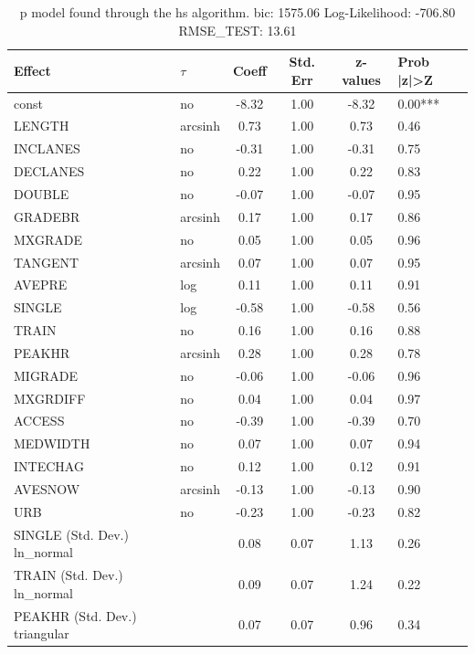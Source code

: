 \begin{table}
	\caption{p model found through the hs algorithm. bic: 1575.06 Log-Likelihood: -706.80 RMSE_TEST: 13.61}
	\begin{center}
		\begin{tabular}{|l|l|c|c|c|l|}
			\hline
			Effect & $\tau$ & Coeff & Std. Err & z-values & Prob |z|>Z \\
			\hline
			const & no & -8.32 & 1.00 & -8.32 & 0.00*** \\
			\hline
			LENGTH & arcsinh & 0.73 & 1.00 & 0.73 & 0.46 \\
			\hline
			INCLANES & no & -0.31 & 1.00 & -0.31 & 0.75 \\
			\hline
			DECLANES & no & 0.22 & 1.00 & 0.22 & 0.83 \\
			\hline
			DOUBLE & no & -0.07 & 1.00 & -0.07 & 0.95 \\
			\hline
			GRADEBR & arcsinh & 0.17 & 1.00 & 0.17 & 0.86 \\
			\hline
			MXGRADE & no & 0.05 & 1.00 & 0.05 & 0.96 \\
			\hline
			TANGENT & arcsinh & 0.07 & 1.00 & 0.07 & 0.95 \\
			\hline
			AVEPRE & log & 0.11 & 1.00 & 0.11 & 0.91 \\
			\hline
			SINGLE & log & -0.58 & 1.00 & -0.58 & 0.56 \\
			\hline
			TRAIN & no & 0.16 & 1.00 & 0.16 & 0.88 \\
			\hline
			PEAKHR & arcsinh & 0.28 & 1.00 & 0.28 & 0.78 \\
			\hline
			MIGRADE & no & -0.06 & 1.00 & -0.06 & 0.96 \\
			\hline
			MXGRDIFF & no & 0.04 & 1.00 & 0.04 & 0.97 \\
			\hline
			ACCESS & no & -0.39 & 1.00 & -0.39 & 0.70 \\
			\hline
			MEDWIDTH & no & 0.07 & 1.00 & 0.07 & 0.94 \\
			\hline
			INTECHAG & no & 0.12 & 1.00 & 0.12 & 0.91 \\
			\hline
			AVESNOW & arcsinh & -0.13 & 1.00 & -0.13 & 0.90 \\
			\hline
			URB & no & -0.23 & 1.00 & -0.23 & 0.82 \\
			\hline
			SINGLE (Std. Dev.) ln_normal &  & 0.08 & 0.07 & 1.13 & 0.26 \\
			\hline
			TRAIN (Std. Dev.) ln_normal &  & 0.09 & 0.07 & 1.24 & 0.22 \\
			\hline
			PEAKHR (Std. Dev.) triangular &  & 0.07 & 0.07 & 0.96 & 0.34 \\

\end{tabular}
\end{center}
\end{table}
